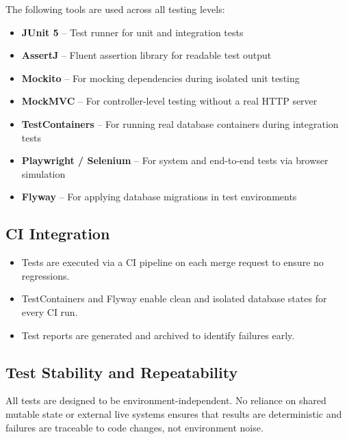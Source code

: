 The following tools are used across all testing levels:

\begin{itemize}
    \item \textbf{JUnit 5} – Test runner for unit and integration tests
    \item \textbf{AssertJ} – Fluent assertion library for readable test output
    \item \textbf{Mockito} – For mocking dependencies during isolated unit testing
    \item \textbf{MockMVC} – For controller-level testing without a real HTTP server
    \item \textbf{TestContainers} – For running real database containers during integration tests
    \item \textbf{Playwright / Selenium} – For system and end-to-end tests via browser simulation
    \item \textbf{Flyway} – For applying database migrations in test environments
\end{itemize}

\subsection*{CI Integration}

\begin{itemize}
    \item Tests are executed via a CI pipeline on each merge request to ensure no regressions.
    \item TestContainers and Flyway enable clean and isolated database states for every CI run.
    \item Test reports are generated and archived to identify failures early.
\end{itemize}

\subsection*{Test Stability and Repeatability}

All tests are designed to be environment-independent. No reliance on shared mutable state or external live systems ensures that results are deterministic and failures are traceable to code changes, not environment noise.

